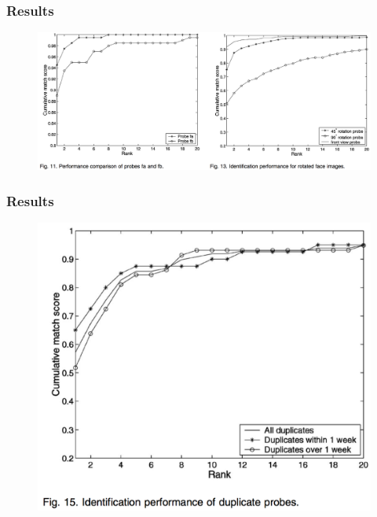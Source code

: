 \documentclass{beamer}
\begin{document}
\begin{frame}
\frametitle{Results}
\begin{figure}
\includegraphics[width=\textwidth]{hyperspectralResults1}
\end{figure}
\end{frame}

\begin{frame}
\frametitle{Results}
\begin{figure}
\includegraphics[height=0.8\textheight]{hyperspectralResults2}
\end{figure}
\end{frame}
\end{document}

